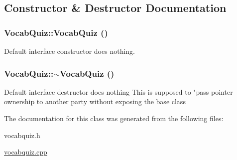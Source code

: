 \subsection{Constructor \& Destructor Documentation}
\hypertarget{classVocabQuiz_aa9f188fd46b6bfd21c8e1e3d5883d350}{
\subsubsection[{VocabQuiz}]{\setlength{\rightskip}{0pt plus 5cm}VocabQuiz::VocabQuiz ()}}
\label{classVocabQuiz_aa9f188fd46b6bfd21c8e1e3d5883d350}
Default interface constructor does nothing. \hypertarget{classVocabQuiz_a55c4c64161cc8e22643b0daa8dcf95a4}{
\subsubsection[{$\sim$VocabQuiz}]{\setlength{\rightskip}{0pt plus 5cm}VocabQuiz::$\sim$VocabQuiz ()}}
\label{classVocabQuiz_a55c4c64161cc8e22643b0daa8dcf95a4}
Default interface destructor does nothing This is supposed to "pass pointer ownership to another party without exposing the base class 

The documentation for this class was generated from the following files:\begin{DoxyCompactItemize}
\item 
vocabquiz.h\item 
\hyperlink{vocabquiz_8cpp}{vocabquiz.cpp}\end{DoxyCompactItemize}
